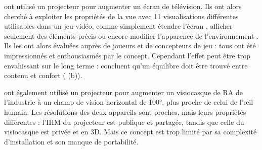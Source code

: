 
\cite{Jones2013} ont utilisé un projecteur pour augmenter un écran de télévision. Ils ont alors cherché à exploiter les propriétés de la vue  avec 11 visualisations différentes utilisables dans un jeu-vidéo, comme simplement étendre l'écran , afficher seulement des éléments précis  ou encore modifier l'apparence de l'environnement . Ils les ont alors évaluées auprès de joueurs et de concepteurs de jeu : tous ont été impressionnés et enthousiasmés par le concept. Cependant l'effet peut être trop envahissant sur le long terme : \cite{Jones2013} concluent qu'un équilibre doit être trouvé entre contenu et confort ( (b)).


\cite{Benko2015} ont également utilisé un projecteur pour augmenter un visiocasque de RA de l'industrie  à un champ de vision horizontal de \ang{100}, plus proche de celui de l'\oe il humain. Les résolutions des deux appareils sont proches, mais leurs propriétés différentes : l'IHM du projecteur est publique et partagée, tandis que celle du visiocasque est privée et en 3D. Mais ce concept est trop limité par sa complexité d'installation et son manque de portabilité.


